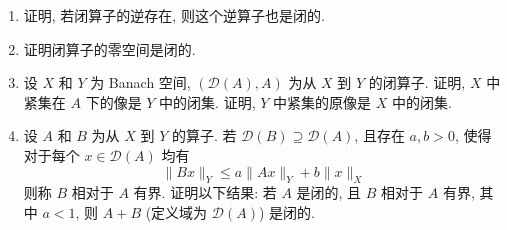 \begin{enumerate}[label=\thesection.\arabic*.,ref=\thesection.\arabic*,start=1,series=book-problems]
\item\label{ex:inverse-of-closed-operator-closed} 证明, 若闭算子的逆存在, 则这个逆算子也是闭的.

\item\label{ex:closed-operator-null-space-closed} 证明闭算子的零空间是闭的.

\item\label{ex:closed-operator-compact-images-and-preimages} 设 $X$ 和 $Y$ 为 Banach 空间, $(\mathcal{D}(A),A)$ 为从 $X$ 到 $Y$ 的闭算子. 证明, $X$ 中紧集在 $A$ 下的像是 $Y$ 中的闭集. 证明, $Y$ 中紧集的原像是 $X$ 中的闭集.

\item\label{ex:relative-bound-closed-operator-sum} 设 $A$ 和 $B$ 为从 $X$ 到 $Y$ 的算子. 若 $\mathcal{D}(B)\supseteq\mathcal{D}(A)$, 且存在 $a,b>0$, 使得对于每个 $x\in\mathcal{D}(A)$ 均有\[\|Bx\|_Y\leq a\|Ax\|_Y+b\|x\|_X\]则称 $B$ 相对于 $A$ 有界. 证明以下结果: 若 $A$ 是闭的, 且 $B$ 相对于 $A$ 有界, 其中 $a<1$, 则 $A+B$ (定义域为 $\mathcal{D}(A)$) 是闭的.

\end{enumerate}
